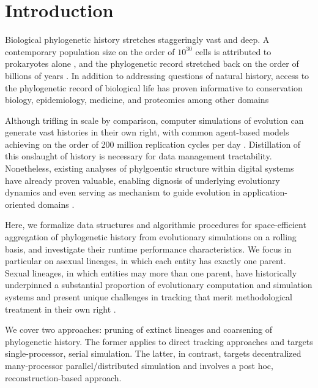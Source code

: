 \section{Introduction} \label{sec:introduction}

Biological phylogenetic history stretches staggeringly vast and deep.
A contemporary population size on the order of $10^{30}$ cells is attributed to prokaryotes alone \citep{whitman1998prokaryotes}, and the phylogenetic record stretched back on the order of billions of years \citep{arndt2012processes}.
In addition to addressing questions of natural history, access to the phylogenetic record of biological life has proven informative to conservation biology, epidemiology, medicine, and proteomics among other domains \citep{STAMATAKIS2005phylogenetics}

Although trifling in scale by comparison, computer simulations of evolution can generate vast histories in their own right, with common agent-based models achieving on the order of 200 million replication cycles per day \citep{ofria2009avida}.
Distillation of this onslaught of history is necessary for data management tractability.
Nonetheless, existing analyses of phylgoentic structure within digital systems have already proven valuable, enabling dignosis of underlying evolutionry dynamics \cite{moreno2023toward,hernandez2022can,shahbandegan2022untangling} and even serving as mechanism to guide evolution in application-oriented domains \cite{lalejini2024phylogeny,lalejini2024runtime,murphy2008simple,burke2003increased}.

Here, we formalize data structures and algorithmic procedures for space-efficient aggregation of phylogenetic history from evolutionary simulations on a rolling basis, and investigate their runtime performance characteristics.
We focus in particular on asexual lineages, in which each entity has exactly one parent.
Sexual lineages, in which entities may more than one parent, have historically underpinned a substantial proportion of evolutionary computation and simulation systems \citep{koza1994genetic,jefferson1990evolution} and present unique challenges in tracking that merit methodological treatment in their own right \citep{godin2019apoget,moreno2024methods,mcphee2018detailed}.

We cover two approaches: pruning of extinct lineages and coarsening of phylogenetic history.
The former applies to direct tracking approaches and targets single-processor, serial simulation.
The latter, in contrast, targets decentralized many-processor parallel/distributed simulation and involves a post hoc, reconstruction-based approach.

